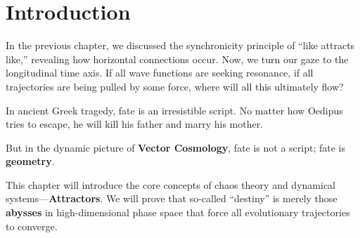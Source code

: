 \section{Introduction}

In the previous chapter, we discussed the synchronicity principle of ``like attracts like,'' revealing how horizontal connections occur. Now, we turn our gaze to the longitudinal time axis. If all wave functions are seeking resonance, if all trajectories are being pulled by some force, where will all this ultimately flow?

In ancient Greek tragedy, fate is an irresistible script. No matter how Oedipus tries to escape, he will kill his father and marry his mother.

But in the dynamic picture of \textbf{Vector Cosmology}, fate is not a script; fate is \textbf{geometry}.

This chapter will introduce the core concepts of chaos theory and dynamical systems---\textbf{Attractors}. We will prove that so-called ``destiny'' is merely those \textbf{abysses} in high-dimensional phase space that force all evolutionary trajectories to converge.

